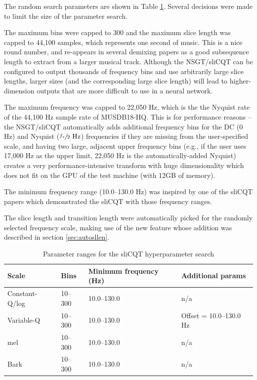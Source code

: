\documentclass[report.tex]{subfiles}
\begin{document}
The random search parameters are shown in Table \ref{table:slicqparams}. Several decisions were made to limit the size of the parameter search.

The maximum bins were capped to 300 and the maximum slice length was capped to 44,100 samples, which represents one second of music. This is a nice round number, and re-appears in several demixing papers \parencite{plumbley1, plumbley2, demucs} as a good subsequence length to extract from a larger musical track. Although the NSGT/sliCQT can be configured to output thousands of frequency bins and use arbitrarily large slice lengths, larger sizes (and the corresponding large slice length) will lead to higher-dimension outputs that are more difficult to use in a neural network.

The maximum frequency was capped to 22,050 Hz, which is the the Nyquist rate of the 44,100 Hz sample rate of MUSDB18-HQ. This is for performance reasons -- the NSGT/sliCQT automatically adds additional frequency bins for the DC (0 Hz) and Nyquist ($\sfrac{f_{s}}{2} \text{ Hz}$) frequencies if they are missing from the user-specified scale, and having two large, adjacent upper frequency bins (e.g., if the user uses 17,000 Hz as the upper limit, 22,050 Hz is the automatically-added Nyquist) creates a very performance-intensive transform with huge dimensionality which does not fit on the GPU of the test machine (with 12GB of memory).

The minimum frequency range (10.0--130.0 Hz) was inspired by one of the sliCQT papers \parencite{slicq} which demonstrated the sliCQT with those frequency ranges.

The slice length and transition length were automatically picked for the randomly selected frequency scale, making use of the new feature whose addition was described in section \ref{sec:autosllen}.

\begin{table}[ht]
	\centering
	\caption{Parameter ranges for the sliCQT hyperparameter search}
	\label{table:slicqparams}
\begin{tabular}{ |l|l|l|l| }
	 \hline
	 Scale & Bins & Minimum frequency (Hz) & Additional params \\
	 \hline
	 \hline
	 Constant-Q/log & 10--300 & 10.0--130.0 & n/a \\
	 \hline
	 Variable-Q & 10--300 & 10.0--130.0 & Offset = 10.0--130.0 Hz \\
	 \hline
	 \hline
	 mel & 10--300 & 10.0--130.0 & n/a \\
	 \hline
	 Bark & 10--300 & 10.0--130.0 & n/a \\
	 \hline
\end{tabular}
\end{table}
\end{document}
